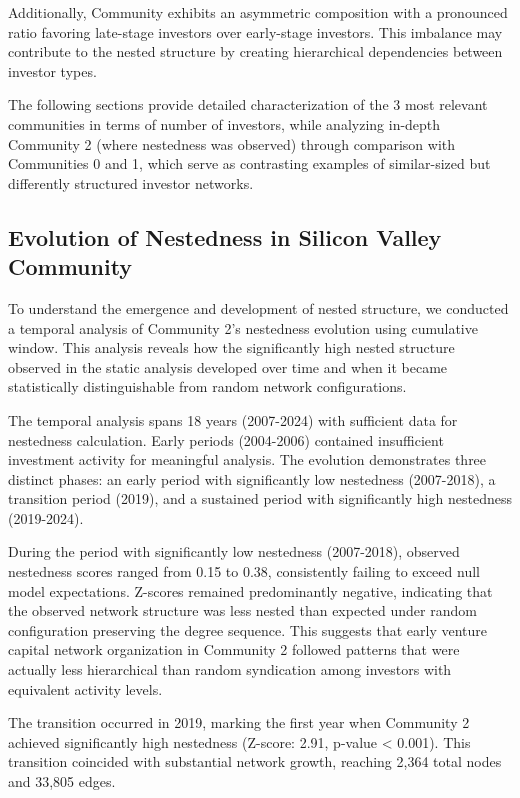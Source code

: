 Additionally, Community \interestingCommunity{} exhibits an asymmetric composition with a pronounced ratio favoring late-stage investors over early-stage investors. This imbalance may contribute to the nested structure by creating hierarchical dependencies between investor types.


The following sections provide detailed characterization of the 3 most relevant communities in terms of number of investors, while analyzing in-depth Community 2 (where nestedness was observed) through comparison with Communities 0 and 1, which serve as contrasting examples of similar-sized but differently structured investor networks.

\subsection{Evolution of Nestedness in Silicon Valley Community}

To understand the emergence and development of nested structure, we conducted a temporal analysis of Community 2's nestedness evolution using cumulative window. This analysis reveals how the significantly high nested structure observed in the static analysis developed over time and when it became statistically distinguishable from random network configurations.

The temporal analysis spans 18 years (2007-2024) with sufficient data for nestedness calculation. Early periods (2004-2006) contained insufficient investment activity for meaningful analysis. The evolution demonstrates three distinct phases: an early period with significantly low nestedness (2007-2018), a transition period (2019), and a sustained period with significantly high nestedness (2019-2024).

During the period with significantly low nestedness (2007-2018), observed nestedness scores ranged from 0.15 to 0.38, consistently failing to exceed null model expectations. Z-scores remained predominantly negative, indicating that the observed network structure was less nested than expected under random configuration preserving the degree sequence. This suggests that early venture capital network organization in Community 2 followed patterns that were actually less hierarchical than random syndication among investors with equivalent activity levels.

The transition occurred in 2019, marking the first year when Community 2 achieved significantly high nestedness (Z-score: 2.91, p-value < 0.001). This transition coincided with substantial network growth, reaching 2,364 total nodes and 33,805 edges. 

